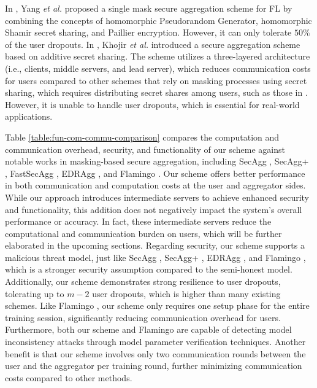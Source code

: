 In \cite{Yang2023}, Yang \emph{et al.} proposed a single mask secure aggregation scheme for FL by combining the concepts of homomorphic Pseudorandom Generator, homomorphic Shamir secret sharing, and Paillier encryption. However, it can only tolerate $50\%$ of the user dropouts. In \cite{Fazli2023}, Khojir \emph{et al.} introduced a secure aggregation scheme based on additive secret sharing. The scheme utilizes a three-layered architecture (i.e., clients, middle servers, and lead server), which reduces communication costs for users compared to other schemes that rely on masking processes using secret sharing, which requires distributing secret shares among users, such as those in \cite{Xu2020, Guo2021, Fereidooni2021, Liu2023, Bell2020, Eltaras2023}. However, it is unable to handle user dropouts, which is essential for real-world applications.
\par 

Table \ref{table:fun-com-commu-comparison} compares the computation and communication overhead, security, and functionality of our scheme against notable works in masking-based secure aggregation, including SecAgg \cite{Bonawitz2017}, SecAgg+ \cite{Bell2020}, FastSecAgg \cite{Kadhe2020}, EDRAgg \cite{Liu2023}, and Flamingo \cite{Ma2023}. Our scheme offers better performance in both communication and computation costs at the user and aggregator sides. While our approach introduces intermediate servers to achieve enhanced security and functionality, this addition does not negatively impact the system's overall performance or accuracy. In fact, these intermediate servers reduce the computational and communication burden on users, which will be further elaborated in the upcoming sections. 
Regarding security, our scheme supports a malicious threat model, just like SecAgg \cite{Bonawitz2017}, SecAgg+ \cite{Bell2020}, EDRAgg \cite{Liu2023}, and Flamingo \cite{Ma2023}, which is a stronger security assumption compared to the semi-honest model. Additionally, our scheme demonstrates strong resilience to user dropouts, tolerating up to $m-2$ user dropouts, which is higher than many existing schemes. Like Flamingo \cite{Ma2023}, our scheme only requires one setup phase for the entire training session, significantly reducing communication overhead for users.
Furthermore, both our scheme and Flamingo are capable of detecting model inconsistency attacks through model parameter verification techniques. Another benefit is that our scheme involves only two communication rounds between the user and the aggregator per training round, further minimizing communication costs compared to other methods.


